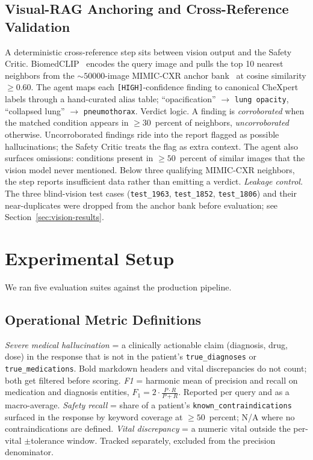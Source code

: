 \documentclass[twocolumn,10pt,main=USenglish]{asmeconf}
\begin{document}
\subsection{Visual-RAG Anchoring and Cross-Reference Validation}
A deterministic cross-reference step sits between vision output
and the Safety Critic. BiomedCLIP~\cite{zhang2024biomedclip}
encodes the query image and pulls the top \num{10} nearest
neighbors from the ${\sim}\num{50000}$-image MIMIC-CXR anchor
bank~\cite{johnson2019mimiccxr} at cosine similarity
$\geq \num{0.60}$. The agent maps each \texttt{[HIGH]}-confidence
finding to canonical CheXpert labels through a hand-curated alias
table; ``opacification'' $\to$ \texttt{lung opacity},
``collapsed lung'' $\to$ \texttt{pneumothorax}. Verdict logic.
A finding is \emph{corroborated} when the matched condition
appears in $\geq \num{30}$~percent of neighbors,
\emph{uncorroborated} otherwise. Uncorroborated findings ride into
the report flagged as possible hallucinations; the Safety Critic
treats the flag as extra context. The agent also surfaces
omissions: conditions present in $\geq \num{50}$~percent of
similar images that the vision model never mentioned. Below three
qualifying MIMIC-CXR neighbors, the step reports insufficient data
rather than emitting a verdict.
\emph{Leakage control.} The three blind-vision test cases
(\texttt{test\_1963}, \texttt{test\_1852}, \texttt{test\_1806})
and their near-duplicates were dropped from the anchor bank before
evaluation; see Section~\ref{sec:vision-results}.

\section{Experimental Setup}
\label{sec:setup}

We ran five evaluation suites against the production pipeline.

\subsection{Operational Metric Definitions}
\label{sec:metric-defs}
\emph{Severe medical hallucination} = a clinically actionable claim
(diagnosis, drug, dose) in the response that is not in the
patient's \texttt{true\_diagnoses} or \texttt{true\_medications}.
Bold markdown headers and vital discrepancies do not count; both
get filtered before scoring. \emph{F1} = harmonic mean of precision
and recall on medication and diagnosis entities,
$F_1 = 2\cdot\tfrac{P\cdot R}{P+R}$. Reported per query and as a
macro-average. \emph{Safety recall} = share of a patient's
\texttt{known\_contraindications} surfaced in the response by
keyword coverage at $\geq \num{50}$~percent; N/A where no
contraindications are defined. \emph{Vital discrepancy} = a
numeric vital outside the per-vital $\pm$tolerance window. Tracked
separately, excluded from the precision denominator.
\end{document}
